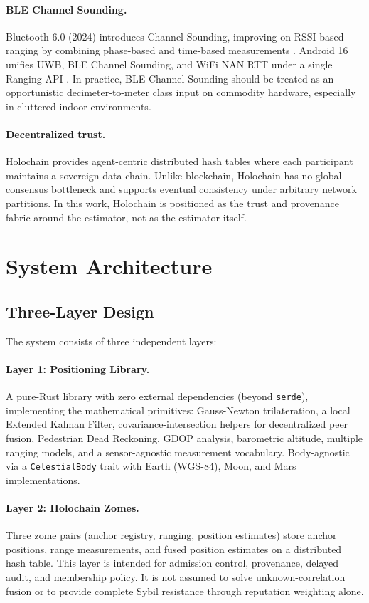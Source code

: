 \documentclass[12pt,a4paper]{article}
\begin{document}
\paragraph{BLE Channel Sounding.} Bluetooth 6.0 (2024) introduces Channel Sounding, improving on RSSI-based ranging by combining phase-based and time-based measurements \citep{bluetooth2024cs}. Android 16 unifies UWB, BLE Channel Sounding, and WiFi NAN RTT under a single Ranging API \citep{android16ranging}. In practice, BLE Channel Sounding should be treated as an opportunistic decimeter-to-meter class input on commodity hardware, especially in cluttered indoor environments.

\paragraph{Decentralized trust.} Holochain \citep{holochain2024} provides agent-centric distributed hash tables where each participant maintains a sovereign data chain. Unlike blockchain, Holochain has no global consensus bottleneck and supports eventual consistency under arbitrary network partitions. In this work, Holochain is positioned as the trust and provenance fabric around the estimator, not as the estimator itself.

\section{System Architecture}

\subsection{Three-Layer Design}

The system consists of three independent layers:

\paragraph{Layer 1: Positioning Library.} A pure-Rust library with zero external dependencies (beyond \texttt{serde}), implementing the mathematical primitives: Gauss-Newton trilateration, a local Extended Kalman Filter, covariance-intersection helpers for decentralized peer fusion, Pedestrian Dead Reckoning, GDOP analysis, barometric altitude, multiple ranging models, and a sensor-agnostic measurement vocabulary. Body-agnostic via a \texttt{CelestialBody} trait with Earth (WGS-84), Moon, and Mars implementations.

\paragraph{Layer 2: Holochain Zomes.} Three zome pairs (anchor registry, ranging, position estimates) store anchor positions, range measurements, and fused position estimates on a distributed hash table. This layer is intended for admission control, provenance, delayed audit, and membership policy. It is not assumed to solve unknown-correlation fusion or to provide complete Sybil resistance through reputation weighting alone.
\end{document}
